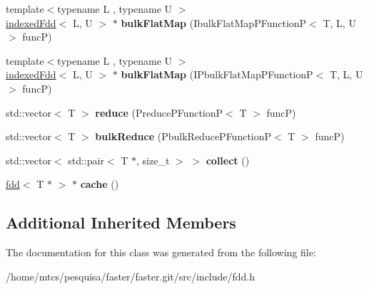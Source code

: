 \begin{DoxyCompactItemize}
\item 
\hypertarget{classfaster_1_1fdd_3_01T_01_5_01_4_ac930844af424e4434920531d285addaf}{}{\footnotesize template$<$typename L , typename U $>$ }\\\hyperlink{classfaster_1_1indexedFdd}{indexed\+Fdd}$<$ L, U $>$ $\ast$ {\bfseries bulk\+Flat\+Map} (Ibulk\+Flat\+Map\+P\+Function\+P$<$ T, L, U $>$ func\+P)\label{classfaster_1_1fdd_3_01T_01_5_01_4_ac930844af424e4434920531d285addaf}

\item 
\hypertarget{classfaster_1_1fdd_3_01T_01_5_01_4_a9215f59e778be75025275ee5954beacb}{}{\footnotesize template$<$typename L , typename U $>$ }\\\hyperlink{classfaster_1_1indexedFdd}{indexed\+Fdd}$<$ L, U $>$ $\ast$ {\bfseries bulk\+Flat\+Map} (I\+Pbulk\+Flat\+Map\+P\+Function\+P$<$ T, L, U $>$ func\+P)\label{classfaster_1_1fdd_3_01T_01_5_01_4_a9215f59e778be75025275ee5954beacb}

\item 
\hypertarget{classfaster_1_1fdd_3_01T_01_5_01_4_a14f17acd4d8412255e0b075d51f04a3f}{}std\+::vector$<$ T $>$ {\bfseries reduce} (Preduce\+P\+Function\+P$<$ T $>$ func\+P)\label{classfaster_1_1fdd_3_01T_01_5_01_4_a14f17acd4d8412255e0b075d51f04a3f}

\item 
\hypertarget{classfaster_1_1fdd_3_01T_01_5_01_4_a95830370065eb3bd41ea93b7843199be}{}std\+::vector$<$ T $>$ {\bfseries bulk\+Reduce} (Pbulk\+Reduce\+P\+Function\+P$<$ T $>$ func\+P)\label{classfaster_1_1fdd_3_01T_01_5_01_4_a95830370065eb3bd41ea93b7843199be}

\item 
\hypertarget{classfaster_1_1fdd_3_01T_01_5_01_4_aa2e17d79b0f34c2722f9502b8ca56d29}{}std\+::vector$<$ std\+::pair$<$ T $\ast$, size\+\_\+t $>$ $>$ {\bfseries collect} ()\label{classfaster_1_1fdd_3_01T_01_5_01_4_aa2e17d79b0f34c2722f9502b8ca56d29}

\item 
\hypertarget{classfaster_1_1fdd_3_01T_01_5_01_4_a819ca1aeeee4808b7c19a7d30d3be249}{}\hyperlink{classfaster_1_1fdd}{fdd}$<$ T $\ast$ $>$ $\ast$ {\bfseries cache} ()\label{classfaster_1_1fdd_3_01T_01_5_01_4_a819ca1aeeee4808b7c19a7d30d3be249}

\end{DoxyCompactItemize}
\subsection*{Additional Inherited Members}


The documentation for this class was generated from the following file\+:\begin{DoxyCompactItemize}
\item 
/home/mtcs/pesquisa/faster/faster.\+git/src/include/fdd.\+h\end{DoxyCompactItemize}
